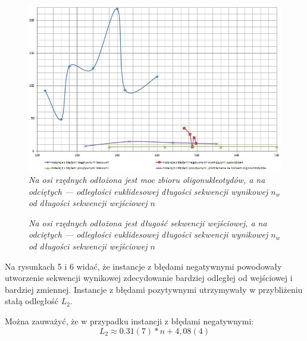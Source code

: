 \documentclass{article}
\begin{document}
\begin{figure}[h]
\center
\includegraphics[scale=0.75]{Przechwytywanie3.jpg}
\caption{\textit{Na osi rzędnych odłożona jest moc zbioru oligonukleotydów, a na odciętych --- odległości euklidesowej długości sekwencji wynikowej $n_w$ od długości sekwencji wejściowej $n$}}
\end{figure}

\begin{figure}[h]

\caption{\textit{Na osi rzędnych odłożona jest długość sekwencji wejściowej, a na odciętych --- odległości euklidesowej długości sekwencji wynikowej $n_w$ od długości sekwencji wejściowej $n$}}
\end{figure}

Na rysunkach 5 i 6 widać, że instancje z błędami negatywnymi powodowały utworzenie sekwencji wynikowej zdecydowanie bardziej odległej od wejściowej i bardziej zmiennej.
Instancje z błędami pozytywnymi utrzymywały w przybliżeniu stałą odległość $L_2$.

Można zauważyć, że w przypadku instancji z błędami negatywnymi:
\begin{equation}
L_2 \approx 0.31(7)*n+4,08(4)
\end{equation}
\end{document}
